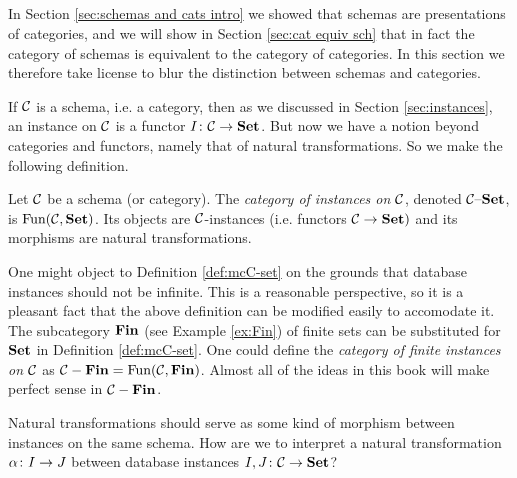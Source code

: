 \documentclass[CT4S-EN-RU]{subfiles}
\begin{document}

\subsection{}

In Section \ref{sec:schemas and cats intro} we showed that schemas are presentations of categories, and we will show in Section \ref{sec:cat equiv sch} that in fact the category of schemas is equivalent to the category of categories. In this section we therefore take license to blur the distinction between schemas and categories.

If $\mathcal{C}$ is a schema, i.e. a category, then as we discussed in Section \ref{sec:instances}, an instance on $\mathcal{C}$ is a functor $I\colon\mathcal{C}\rightarrow{\bf Set}$. But now we have a notion beyond categories and functors, namely that of natural transformations. So we make the following definition.

\begin{definition}\label{def:mcC-set}

Let $\mathcal{C}$ be a schema (or category). The {\em category of instances on $\mathcal{C}$}, denoted $\mathcal{C}{\text \textendash}{\bf Set}$, is $\textnormal{Fun}(\mathcal{C},{\bf Set})$. Its objects are $\mathcal{C}$-instances (i.e. functors $\mathcal{C}\rightarrow{\bf Set})$ and its morphisms are natural transformations.

\end{definition}

\begin{remark}

One might object to Definition \ref{def:mcC-set} on the grounds that database instances should not be infinite. This is a reasonable perspective, so it is a pleasant fact that the above definition can be modified easily to accomodate it. The subcategory ${\bf Fin}$ (see Example \ref{ex:Fin}) of finite sets can be substituted for ${\bf Set}$ in Definition \ref{def:mcC-set}. One could define the {\em category of finite instances on $\mathcal{C}$} as $\mathcal{C}-{\bf Fin}=\textnormal{Fun}(\mathcal{C},{\bf Fin})$. Almost all of the ideas in this book will make perfect sense in $\mathcal{C}-{\bf Fin}$.

\end{remark}

Natural transformations should serve as some kind of morphism between instances on the same schema. How are we to interpret a natural transformation $\alpha\colon I\rightarrow J$ between database instances $I,J\colon\mathcal{C}\rightarrow{\bf Set}$? 
\end{document}
